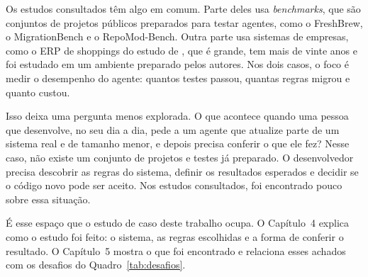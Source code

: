 Os estudos consultados têm algo em comum. Parte deles usa \textit{benchmarks}, que são conjuntos de projetos públicos preparados para testar agentes, como o FreshBrew, o MigrationBench e o RepoMod-Bench. Outra parte usa sistemas de empresas, como o ERP de shoppings do estudo de , que é grande, tem mais de vinte anos e foi estudado em um ambiente preparado pelos autores. Nos dois casos, o foco é medir o desempenho do agente: quantos testes passou, quantas regras migrou e quanto custou.

Isso deixa uma pergunta menos explorada. O que acontece quando uma pessoa que desenvolve, no seu dia a dia, pede a um agente que atualize parte de um sistema real e de tamanho menor, e depois precisa conferir o que ele fez? Nesse caso, não existe um conjunto de projetos e testes já preparado. O desenvolvedor precisa descobrir as regras do sistema, definir os resultados esperados e decidir se o código novo pode ser aceito. Nos estudos consultados, foi encontrado pouco sobre essa situação.

É esse espaço que o estudo de caso deste trabalho ocupa. O Capítulo~4 explica como o estudo foi feito: o sistema, as regras escolhidas e a forma de conferir o resultado. O Capítulo~5 mostra o que foi encontrado e relaciona esses achados com os desafios do Quadro~\ref{tab:desafios}.
